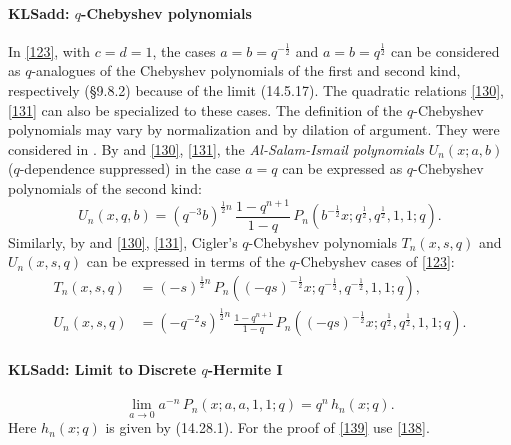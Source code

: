 \documentclass[envcountchap,graybox]{svmono}
\newcommand\half{\frac12}
\begin{document}
\paragraph{\large\bf KLSadd: $q$-Chebyshev polynomials}In \eqref{123}, with $c=d=1$, the cases $a=b=q^{-\half}$ and $a=b=q^\half$ can be considered
as $q$-analogues of the Chebyshev polynomials of the first and second kind, respectively
(\S9.8.2) because of the limit (14.5.17). The quadratic relations \eqref{130}, \eqref{131}
can also be specialized to these cases. The definition of the $q$-Chebyshev polynomials
may vary by normalization and by dilation of argument. They were considered in
\cite{K18}. 
By  and \eqref{130}, \eqref{131}, the {\em Al-Salam-Ismail polynomials}
$U_n(x;a,b)$ ($q$-dependence suppressed) in the case $a=q$ can be expressed as
$q$-Chebyshev polynomials of the second kind:
\begin{equation*}
U_n(x,q,b)=(q^{-3} b)^{\half n}\,\frac{1-q^{n+1}}{1-q}\,
P_n(b^{-\half}x;q^\half,q^\half,1,1;q).
\end{equation*}
Similarly, by \cite[(5.4), (5.1), (5.3)]{K19} and \eqref{130}, \eqref{131}, Cigler's $q$-Chebyshev
polynomials $T_n(x,s,q)$ and $U_n(x,s,q)$
can be expressed in terms of the $q$-Chebyshev cases of \eqref{123}:
\begin{align*}
T_n(x,s,q)&=(-s)^{\half n}\,P_n((-qs)^{-\half} x;q^{-\half},q^{-\half},1,1;q),\\
U_n(x,s,q)&=(-q^{-2}s)^{\half n}\,\frac{1-q^{n+1}}{1-q}\,
P_n((-qs)^{-\half} x;q^{\half},q^{\half},1,1;q).
\end{align*}
%
\paragraph{\large\bf KLSadd: Limit to Discrete $q$-Hermite I}\begin{equation}
\lim_{a\to0} a^{-n}\,P_n(x;a,a,1,1;q)=q^n\,h_n(x;q).
\label{139}
\end{equation}
Here $h_n(x;q)$ is given by (14.28.1).
For the proof of \eqref{139} use \eqref{138}.
%
\end{document}
